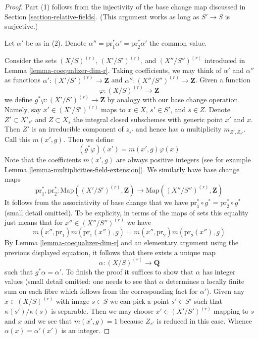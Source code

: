\begin{proof}
Part (1) follows from the injectivity of the base change map discussed
in Section \ref{section-relative-fields}. (This argument works as
long as $S' \to S$ is surjective.)

\medskip\noindent
Let $\alpha'$ be as in (2). Denote
$\alpha'' = \text{pr}_1^*\alpha' = \text{pr}_2^*\alpha'$
the common value.

\medskip\noindent
Consider the sets $(X/S)^{(r)}$, $(X'/S')^{(r)}$, and $(X''/S'')^{(r)}$
introduced in Lemma \ref{lemma-coequalizer-dim-r}. Taking coefficients,
we may think of $\alpha'$ and $\alpha''$ as functions
$\alpha' : (X'/S')^{(r)} \to \mathbf{Z}$ and
$\alpha'' : (X''/S'')^{(r)} \to \mathbf{Z}$.
Given a function
$$
\varphi : (X/S)^{(r)} \to \mathbf{Z}
$$
we define $g^*\varphi : (X'/S')^{(r)} \to \mathbf{Z}$ by analogy
with our base change operation. Namely, say $x' \in (X'/S')^{(r)}$
maps to $x \in X$, $s' \in S'$, and $s \in Z$.
Denote $Z' \subset X'_{s'}$ and $Z \subset X_s$ the integral
closed subschemes with generic point $x'$ and $x$.
Then $Z'$ is an irreducible component of $z_{s'}$ and
hence has a multiplicity $m_{Z', Z_{s'}}$. Call this $m(x', g)$.
Then we define
$$
(g^*\varphi)(x') = m(x', g) \varphi(x)
$$
Note that the coefficients $m(x', g)$ are always positive integers
(see for example Lemma \ref{lemma-multiplicities-field-extension}).
We similarly have base change maps
$$
\text{pr}_1^*, \text{pr}_2^* :
\text{Map}((X'/S')^{(r)}, \mathbf{Z})
\longrightarrow
\text{Map}((X''/S'')^{(r)}, \mathbf{Z})
$$
It follows from the associativity of base change that we have
$\text{pr}_1^* \circ g^* = \text{pr}_2^* \circ g^*$ (small detail
omitted). To be explicity, in terms of the maps of sets this
equality just means that for $x'' \in (X''/S'')^{(r)}$ we have
$$
m(x'', \text{pr}_1) m(\text{pr}_1(x''), g) =
m(x'', \text{pr}_2) m(\text{pr}_2(x''), g)
$$
By Lemma \ref{lemma-coequalizer-dim-r} and an elementary argument
using the previous displayed equation,
it follows that there exists a unique map
$$
\alpha : (X/S)^{(r)} \to \mathbf{Q}
$$
such that $g^*\alpha = \alpha'$. To finish the proof it suffices
to show that $\alpha$ has integer values (small detail omitted: one
needs to see that $\alpha$ determines a locally finite sum on
each fibre which follows from the corresponding fact for $\alpha'$).
Given any $x \in (X/S)^{(r)}$ with image $s \in S$
we can pick a point $s' \in S'$ such that $\kappa(s')/\kappa(s)$
is separable. Then we may choose $x' \in (X'/S')^{(r)}$ mapping
to $s$ and $x$ and we see that $m(x', g) = 1$ because
$Z_{s'}$ is reduced in this case. Whence $\alpha(x) = \alpha'(x')$
is an integer.
\end{proof}

